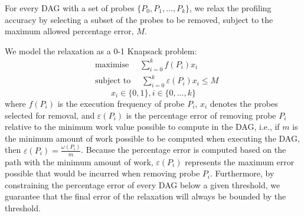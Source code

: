 \documentclass[sigplan,10pt]{acmart}
\theoremstyle{definition}
\newtheorem{prop}{Proposition}[section]
\begin{document}
For every DAG with a set of probes $\{P_0, P_1, \ldots, P_k\}$, we relax the profiling accuracy by selecting a subset of the probes to be removed, subject to the maximum allowed percentage error, $M$.

We model the relaxation as a 0-1 Knapsack problem:
\begin{equation*}
\begin{aligned}
& \textrm{maximise }\quad \sum_{i=0}^{k} f(P_i)x_i \\
& \textrm{subject to }\quad \sum_{i=0}^{k} \varepsilon(P_i)x_i \leq M
\end{aligned}
\end{equation*}
\[
x_i\in\{0,1\}, i\in\{0,\ldots,k\}
\]
where $f(P_i)$ is the execution frequency of probe $P_i$, $x_i$ denotes the probes selected for removal, and $\varepsilon(P_i)$ is the percentage error of removing probe $P_i$ relative to the minimum work value possible to compute in the DAG, i.e., if $m$ is the minimum amount of work possible to be computed when executing the DAG, then $\varepsilon(P_i) = \frac{\omega(P_i)}{m}$.
Because the percentage error is computed based on the path with the minimum amount of work, $\varepsilon(P_i)$ represents the maximum error possible that would be incurred when removing probe $P_i$.
 Furthermore, by constraining the percentage error of every DAG below a given threshold, we guarantee that the final error of the relaxation will always be bounded by the threshold.
%
\end{document}
